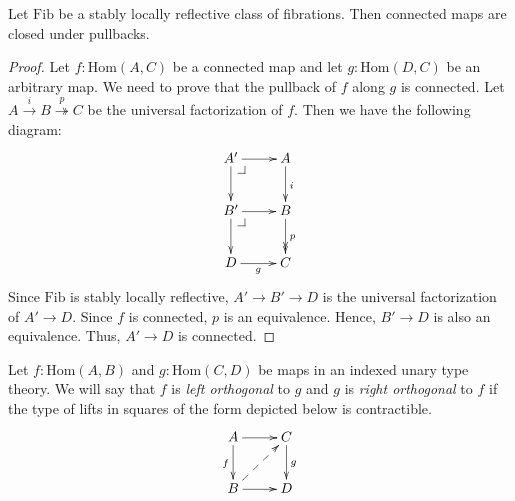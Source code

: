 \documentclass[reqno]{amsart}
\makeatletter
\theoremstyle{definition}
\theoremstyle{remark}
\newcommand{\fs}[1]{\mathrm{#1}}
\newcommand{\Hom}{\fs{Hom}}
\newcommand{\Fib}{\fs{Fib}}
\numberwithin{figure}{section}
\newcommand{\pb}[1][dr]{\save*!/#1-1.2pc/#1:(-1,1)@^{|-}\restore}
\makeatother
\begin{document}
\begin{lem}
Let $\Fib$ be a stably locally reflective class of fibrations.
Then connected maps are closed under pullbacks.
\end{lem}
\begin{proof}
Let $f : \Hom(A,C)$ be a connected map and let $g : \Hom(D,C)$ be an arbitrary map.
We need to prove that the pullback of $f$ along $g$ is connected.
Let $A \xrightarrow{i} B \overset{p}\twoheadrightarrow C$ be the universal factorization of $f$.
Then we have the following diagram:
\[ \xymatrix{ A' \ar[r] \ar[d] \pb  & A \ar[d]^i \\
              B' \ar[r] \ar[d] \pb  & B \ar@{->>}[d]^p \\
              D  \ar[r]_g           & C
            } \]
Since $\Fib$ is stably locally reflective, $A' \to B' \to D$ is the universal factorization of $A' \to D$.
Since $f$ is connected, $p$ is an equivalence.
Hence, $B' \to D$ is also an equivalence.
Thus, $A' \to D$ is connected.
\end{proof}

\begin{defn}
Let $f : \Hom(A,B)$ and $g : \Hom(C,D)$ be maps in an indexed unary type theory.
We will say that $f$ is \emph{left orthogonal} to $g$ and $g$ is \emph{right orthogonal} to $f$ if the type of lifts in squares of the form depicted below is contractible.
\[ \xymatrix{ A \ar[r] \ar[d]_f         & C \ar[d]^g \\
              B \ar[r] \ar@{-->}[ur]    & D
            } \]
\end{defn}
\end{document}
